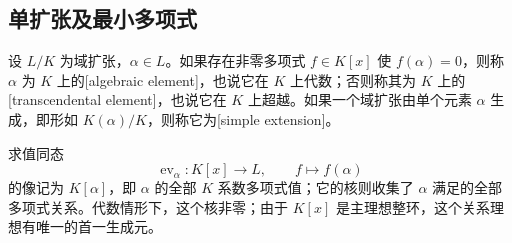 \subsection{单扩张及最小多项式}
\label{b1:subsec:1401:03}

\begin{definition}\label{b1:def:algebraic-element}
	设 \(L/K\) 为域扩张，\(\alpha\in L\)。如果存在非零多项式 \(f\in K[x]\) 使 \(f(\alpha)=0\)，则称 \(\alpha\) 为 \(K\) 上的[algebraic element]，也说它在 \(K\) 上代数；否则称其为 \(K\) 上的[transcendental element]，也说它在 \(K\) 上超越。如果一个域扩张由单个元素 \(\alpha\) 生成，即形如 \(K(\alpha)/K\)，则称它为[simple extension]。
\end{definition}

求值同态
\[
	\operatorname{ev}_{\alpha}:K[x]\longrightarrow L,\qquad f\longmapsto f(\alpha)
\]
的像记为 \(K[\alpha]\)，即 \(\alpha\) 的全部 \(K\) 系数多项式值；它的核则收集了 \(\alpha\) 满足的全部多项式关系。代数情形下，这个核非零；由于 \(K[x]\) 是主理想整环，这个关系理想有唯一的首一生成元。

